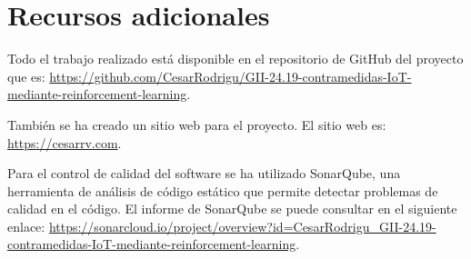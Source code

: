 \section{Recursos adicionales}
Todo el trabajo realizado está disponible en el repositorio de GitHub del proyecto que es: \url{https://github.com/CesarRodrigu/GII-24.19-contramedidas-IoT-mediante-reinforcement-learning}. 

También se ha creado un sitio web para el proyecto. El sitio web es: \url{https://cesarrv.com}.

Para el control de calidad del software se ha utilizado SonarQube, una herramienta de análisis de código estático que permite detectar problemas de calidad en el código. El informe de SonarQube se puede consultar en el siguiente enlace: \url{https://sonarcloud.io/project/overview?id=CesarRodrigu_GII-24.19-contramedidas-IoT-mediante-reinforcement-learning}.